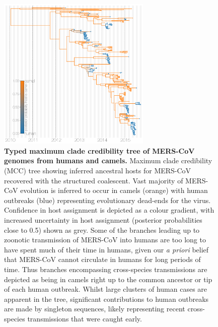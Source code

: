 \documentclass[11pt,oneside,letterpaper]{article}
\begin{document}
\begin{figure}[h]
 \centering
	\includegraphics[width=0.65\textwidth]{figures/mers_mcc.png}
	\caption{\textbf{Typed maximum clade credibility tree of MERS-CoV genomes from humans and camels.}
	Maximum clade credibility (MCC) tree showing inferred ancestral hosts for MERS-CoV recovered with the structured coalescent.
	Vast majority of MERS-CoV evolution is inferred to occur in camels (orange) with human outbreaks (blue) representing evolutionary dead-ends for the virus.
  Confidence in host assignment is depicted as a colour gradient, with increased uncertainty in host assignment (posterior probabilities close to 0.5) shown as grey.
  Some of the branches leading up to zoonotic transmission of MERS-CoV into humans are too long to have spent much of their time in humans, given our \textit{a priori} belief that MERS-CoV cannot circulate in humans for long periods of time.
  Thus branches encompassing cross-species transmissions are depicted as being in camels right up to the common ancestor or tip of each human outbreak.
	Whilst large clusters of human cases are apparent in the tree, significant contributions to human outbreaks are made by singleton sequences, likely representing recent cross-species transmissions that were caught early.
	}
	\label{mcc}
\end{figure}
\end{document}
